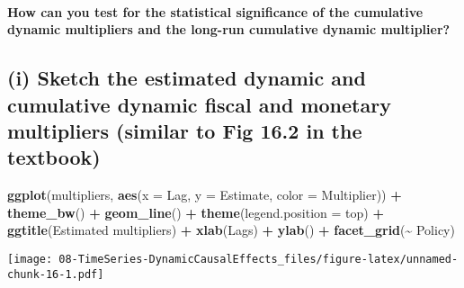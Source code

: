 \documentclass[
]{article}
\newenvironment{Shaded}{\begin{snugshade}}{\end{snugshade}}
\newcommand{\AttributeTok}[1]{\textcolor[rgb]{0.13,0.29,0.53}{#1}}
\newcommand{\FunctionTok}[1]{\textcolor[rgb]{0.13,0.29,0.53}{\textbf{#1}}}
\newcommand{\NormalTok}[1]{#1}
\newcommand{\SpecialCharTok}[1]{\textcolor[rgb]{0.81,0.36,0.00}{\textbf{#1}}}
\newcommand{\StringTok}[1]{\textcolor[rgb]{0.31,0.60,0.02}{#1}}
\begin{document}
\hypertarget{how-can-you-test-for-the-statistical-significance-of-the-cumulative-dynamic-multipliers-and-the-long-run-cumulative-dynamic-multiplier}{%
\paragraph{How can you test for the statistical significance of the
cumulative dynamic multipliers and the long-run cumulative dynamic
multiplier?}\label{how-can-you-test-for-the-statistical-significance-of-the-cumulative-dynamic-multipliers-and-the-long-run-cumulative-dynamic-multiplier}}

\hypertarget{i-sketch-the-estimated-dynamic-and-cumulative-dynamic-fiscal-and-monetary-multipliers-similar-to-fig-16.2-in-the-textbook}{%
\subsection{(i) Sketch the estimated dynamic and cumulative dynamic
fiscal and monetary multipliers (similar to Fig 16.2 in the
textbook)}\label{i-sketch-the-estimated-dynamic-and-cumulative-dynamic-fiscal-and-monetary-multipliers-similar-to-fig-16.2-in-the-textbook}}

\begin{Shaded}
\begin{Highlighting}[]
\FunctionTok{ggplot}\NormalTok{(multipliers, }\FunctionTok{aes}\NormalTok{(}\AttributeTok{x =}\NormalTok{ Lag, }\AttributeTok{y =}\NormalTok{ Estimate, }\AttributeTok{color =}\NormalTok{ Multiplier)) }\SpecialCharTok{+}
  \FunctionTok{theme\_bw}\NormalTok{() }\SpecialCharTok{+}
  \FunctionTok{geom\_line}\NormalTok{() }\SpecialCharTok{+}
  \FunctionTok{theme}\NormalTok{(}\AttributeTok{legend.position =} \StringTok{\textquotesingle{}top\textquotesingle{}}\NormalTok{) }\SpecialCharTok{+}
  \FunctionTok{ggtitle}\NormalTok{(}\StringTok{\textquotesingle{}Estimated multipliers\textquotesingle{}}\NormalTok{) }\SpecialCharTok{+}
  \FunctionTok{xlab}\NormalTok{(}\StringTok{\textquotesingle{}Lags\textquotesingle{}}\NormalTok{) }\SpecialCharTok{+} \FunctionTok{ylab}\NormalTok{(}\StringTok{\textquotesingle{}\textquotesingle{}}\NormalTok{) }\SpecialCharTok{+} \FunctionTok{facet\_grid}\NormalTok{(}\SpecialCharTok{\textasciitilde{}}\NormalTok{ Policy)}
\end{Highlighting}
\end{Shaded}

\texttt{[image: 08-TimeSeries-DynamicCausalEffects\_files/figure-latex/unnamed-chunk-16-1.pdf]}
\end{document}
